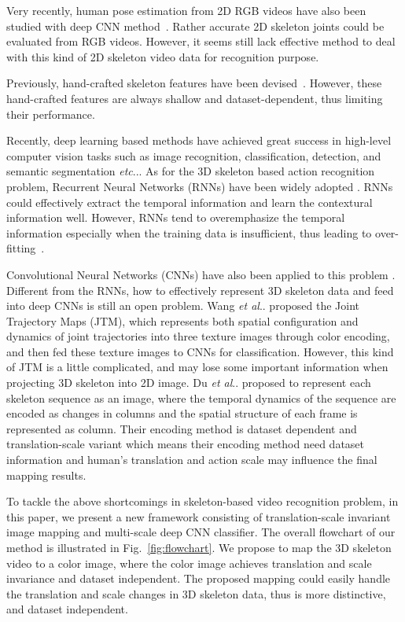 \documentclass[10pt,journal]{IEEEtran}
\makeatletter
\DeclareRobustCommand\onedot{\futurelet\@let@token\@onedot}
\def\@onedot{\ifx\@let@token.\else.\null\fi\xspace}
\def\etc{\emph{etc}\onedot} \def\vs{\emph{vs}\onedot}
\def\etal{\emph{et al}\onedot}
\makeatother
\begin{document}
Very recently, human pose estimation from 2D RGB videos have also been studied with deep CNN method~\cite{Zhou2015Sparseness,Yang2016End,Toshev2013DeepPose}. Rather accurate 2D skeleton joints could be evaluated from RGB videos. However, it seems still lack effective method to deal with this kind of 2D skeleton video data for recognition purpose.

Previously, hand-crafted skeleton features have been devised~\cite{ Wu2014Leveraging, Vemulapalli2014Human, Barnachon2014Ongoing, Vemulapalli2016R3DG, Vemulapalli2016Rolling}. However, these hand-crafted features are always shallow and dataset-dependent, thus limiting their performance.

Recently, deep learning based methods have achieved great success in high-level computer vision tasks such as image recognition, classification, detection, and semantic segmentation \etc. As for the 3D skeleton based action recognition problem, Recurrent Neural Networks (RNNs) have been widely adopted \cite{Du2015Hierarchical, Veeriah2015Differential, Zhu2016Co, Shahroudy2016NTU, Liu2016Spatio, Song2016An, Du2016Representation}. RNNs could effectively extract the temporal information and learn the contextural information well. However, RNNs tend to overemphasize the temporal information especially when the training data is insufficient, thus leading to over-fitting~\cite{Wang2016Action}.

Convolutional Neural Networks (CNNs) have also been applied to this problem \cite{Wang2016Action, Yong2015Skeleton}. Different from the RNNs, how to effectively represent 3D skeleton data and feed into deep CNNs is still an open problem. 
Wang \etal \cite{Wang2016Action} proposed the Joint Trajectory Maps (JTM), which represents both spatial configuration and dynamics of joint trajectories into three texture images through color encoding, and then fed these texture images to CNNs for classification. However, this kind of JTM is a little complicated, and may lose some important information when projecting 3D skeleton into 2D image. Du \etal \cite{Yong2015Skeleton} proposed to represent each skeleton sequence as an image, where the temporal dynamics of the sequence are encoded as changes in columns and the spatial structure of each frame is represented as column. Their encoding method is dataset dependent and translation-scale variant which means their encoding method need dataset information and human's translation and action scale may influence the final mapping results.

To tackle the above shortcomings in skeleton-based video recognition problem, in this paper, we present a new framework consisting of translation-scale invariant image mapping and multi-scale deep CNN classifier. The overall flowchart of our method is illustrated in Fig.~\ref{fig:flowchart}. We propose to map the 3D skeleton video to a color image, where the color image achieves translation and scale invariance and dataset independent. The proposed mapping could easily handle the translation and scale changes in 3D skeleton data, thus is more distinctive, and dataset independent. 
\end{document}
